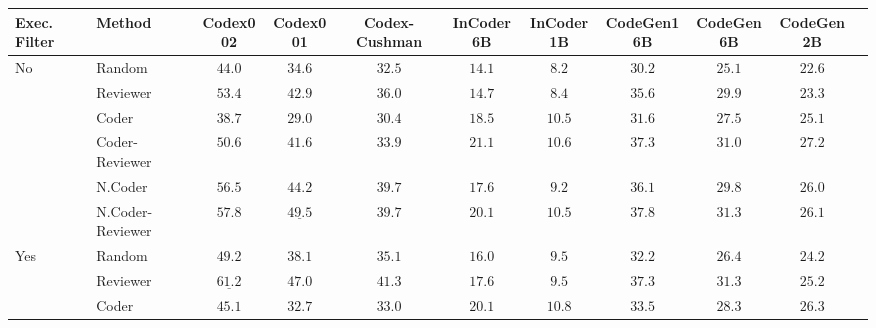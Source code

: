 \documentclass[nohyperref]{article}
\theoremstyle{plain}
\theoremstyle{definition}
\theoremstyle{remark}
\begin{document}
\begin{table*}[]
\setlength{\tabcolsep}{1.5pt}
\footnotesize
\centering
\begin{tabular}{l|lccccccccc}
\toprule
    Exec. Filter & Method &            Codex002 &            Codex001 &       Codex-Cushman &           InCoder6B &           InCoder1B &          CodeGen16B &           CodeGen6B &           CodeGen2B \\
\midrule
\multirow{6}{*}{No} & Random &              $44.0$ &              $34.6$ &              $32.5$ &              $14.1$ &               $8.2$ &              $30.2$ &              $25.1$ &              $22.6$ \\
    & Reviewer &              $53.4$ &              $42.9$ &              $36.0$ &              $14.7$ &               $8.4$ &              $35.6$ &              $29.9$ &              $23.3$ \\
\cmidrule{2-10}
    & Coder &              $38.7$ &              $29.0$ &              $30.4$ &              $18.5$ &              $10.5$ &              $31.6$ &              $27.5$ &              $25.1$ \\
    & Coder-Reviewer &              $50.6$ &              $41.6$ &              $33.9$ &              $21.1$ &              $10.6$ &              $37.3$ &              $31.0$ &              $27.2$ \\
\cmidrule{2-10}
    & N.Coder &              $56.5$ &              $44.2$ &              $39.7$ &              $17.6$ &               $9.2$ &              $36.1$ &              $29.8$ &              $26.0$ \\
    & N.Coder-Reviewer &              $57.8$ &  $\underline{49.5}$ &              $39.7$ &              $20.1$ &              $10.5$ &              $37.8$ &              $31.3$ &              $26.1$ \\
\midrule
\multirow{7}{*}{Yes} & Random &              $49.2$ &              $38.1$ &              $35.1$ &              $16.0$ &               $9.5$ &              $32.2$ &              $26.4$ &              $24.2$ \\
    & Reviewer &  $\underline{61.2}$ &              $47.0$ &              $41.3$ &              $17.6$ &               $9.5$ &              $37.3$ &              $31.3$ &              $25.2$ \\
\cmidrule{2-10}
    & Coder &              $45.1$ &              $32.7$ &              $33.0$ &              $20.1$ &              $10.8$ &              $33.5$ &              $28.3$ &              $26.3$ \\

\end{tabular}
\end{table*}
\end{document}
